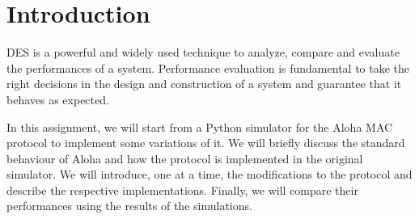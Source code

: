 \section{Introduction}
\label{sec:introduction}

\ac{DES} is a powerful and widely used technique to analyze, compare and evaluate the performances of a system.
Performance evaluation is fundamental to take the right decisions in the design and construction of a system and guarantee that it behaves as expected.  

In this assignment, we will start from a Python simulator for the Aloha \ac{MAC} protocol to implement some variations of it.
We will briefly discuss the standard behaviour of Aloha and how the protocol is implemented in the original simulator.
We will introduce, one at a time, the modifications to the protocol and describe the respective implementations.
Finally, we will compare their performances using the results of the simulations.
